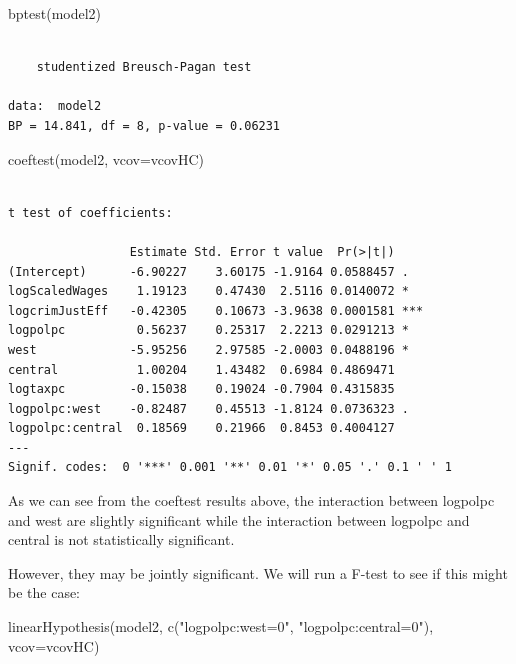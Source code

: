 \documentclass[]{article}
\newenvironment{Shaded}{}{}
\newcommand{\DataTypeTok}[1]{#1}
\newcommand{\KeywordTok}[1]{\textcolor[rgb]{0.00,0.00,1.00}{#1}}
\newcommand{\NormalTok}[1]{#1}
\newcommand{\StringTok}[1]{\textcolor[rgb]{0.00,0.50,0.50}{#1}}
\begin{document}
\begin{Shaded}
\begin{Highlighting}[]
\KeywordTok{bptest}\NormalTok{(model2)}
\end{Highlighting}
\end{Shaded}

\begin{verbatim}

    studentized Breusch-Pagan test

data:  model2
BP = 14.841, df = 8, p-value = 0.06231
\end{verbatim}

\begin{Shaded}
\begin{Highlighting}[]
\KeywordTok{coeftest}\NormalTok{(model2, }\DataTypeTok{vcov=}\NormalTok{vcovHC)}
\end{Highlighting}
\end{Shaded}

\begin{verbatim}

t test of coefficients:

                 Estimate Std. Error t value  Pr(>|t|)    
(Intercept)      -6.90227    3.60175 -1.9164 0.0588457 .  
logScaledWages    1.19123    0.47430  2.5116 0.0140072 *  
logcrimJustEff   -0.42305    0.10673 -3.9638 0.0001581 ***
logpolpc          0.56237    0.25317  2.2213 0.0291213 *  
west             -5.95256    2.97585 -2.0003 0.0488196 *  
central           1.00204    1.43482  0.6984 0.4869471    
logtaxpc         -0.15038    0.19024 -0.7904 0.4315835    
logpolpc:west    -0.82487    0.45513 -1.8124 0.0736323 .  
logpolpc:central  0.18569    0.21966  0.8453 0.4004127    
---
Signif. codes:  0 '***' 0.001 '**' 0.01 '*' 0.05 '.' 0.1 ' ' 1
\end{verbatim}

As we can see from the coeftest results above, the interaction between
logpolpc and west are slightly significant while the interaction between
logpolpc and central is not statistically significant.

However, they may be jointly significant. We will run a F-test to see if
this might be the case:

\begin{Shaded}
\begin{Highlighting}[]
\KeywordTok{linearHypothesis}\NormalTok{(model2, }\KeywordTok{c}\NormalTok{(}\StringTok{"logpolpc:west=0"}\NormalTok{, }\StringTok{"logpolpc:central=0"}\NormalTok{), }\DataTypeTok{vcov=}\NormalTok{vcovHC)}
\end{Highlighting}
\end{Shaded}
\end{document}
